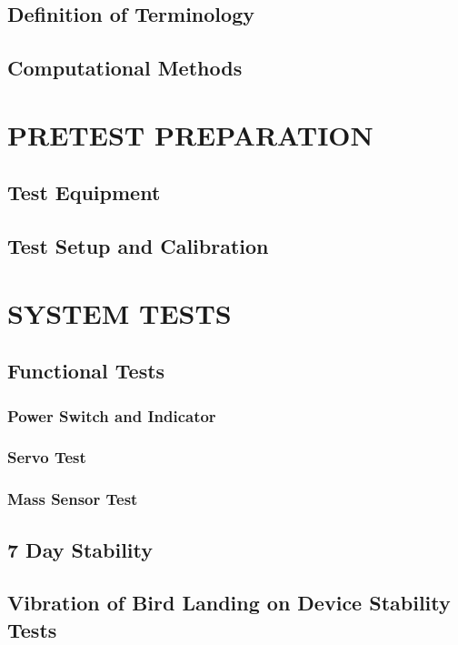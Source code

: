 	\subsection{Definition of Terminology}
	
	\subsection{Computational Methods}
	
	\newpage
	\section{PRETEST PREPARATION}
	\subsection{Test Equipment}
	
	\subsection{Test Setup and Calibration}
	
	\newpage
	\section{SYSTEM TESTS}
	\subsection{Functional Tests}
	\subsubsection{Power Switch and Indicator}
	\subsubsection{Servo Test}
	 
	\newpage
	\subsubsection{Mass Sensor Test}
	 
	\subsection{7 Day Stability}
	\subsection{Vibration of Bird Landing on Device Stability Tests}
	




